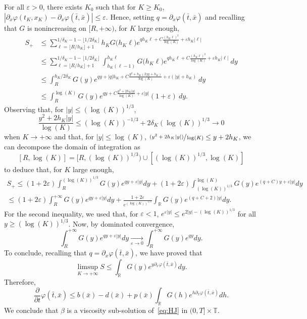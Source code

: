 \documentclass[JEP,XML,SOM,Unicode,published]{cedram}
\let\epsilon\varepsilon
\newcommand{\psfrac}[2]{\sfrac{(#1)}{#2}}
\theoremstyle{plain}
\theoremstyle{remark}
\newcommand\T{\mathbb{T}}
\newcommand\R{\mathbb{R}}
\begin{document}
For all $\varepsilon>0$, there exists $K_0$ such that for $K\geq K_0$, $|\partial_x\varphi(t_K,x_K)-\partial_x\varphi(\bar{t},\bar{x})| \leq \varepsilon$. Hence, setting $q=\partial_x\varphi(\bar{t},\bar{x})$ and recalling that $G$ is nonincreasing on $[R,+\infty)$, for $K$ large enough,\vspace*{-3pt}\enlargethispage{\baselineskip}
\begin{align*}
S_+ & \leq \sum_{\ell= \lfloor R/h_K \rfloor +1}^{1/\delta_K-1-\lfloor 1/2\delta_K\rfloor} h_K G\big(h_K\ell \big)e^{qh_K\ell+C\frac{(h_K\ell)^2}{\log(K)}+\varepsilon h_K|\ell|} \\
& \leq \sum_{\ell=\lfloor R/h_K \rfloor +1}^{1/\delta_K-1-\lfloor 1/2\delta_K\rfloor} \int_{h_K(\ell-1)}^{h_K\ell } G\big(h_K\ell \big)e^{q h_K\ell+C\frac{(h_K\ell)^2}{\log(K)}+\varepsilon h_K|\ell|} \ dy\\
& \leq \int_{R}^{h_K/2\delta_K} G(y) e^{q y+|q|h_K+C\frac{y^2+h_K(2|y|+h_K)}{\log(K)}+\varepsilon (|y|+h_K)}\ dy \\
& \leq \int_{R}^{\log(K)} G(y) e^{q y+C\frac{y^2+2h_K|y|}{\log(K)}+\varepsilon |y|}(1+\varepsilon)\ dy.
\end{align*}
Observing that, for $|y|\leq (\log(K))^{1/3}$,\vspace*{-3pt}
\[\frac{y^2+2h_K|y|}{\log(K)}\leq (\log(K))^{-1/3}+2\delta_K(\log(K))^{1/3}\to 0\]
when $K\to+\infty$ and that, for $|y|\leq \log(K)$, $\psfrac{y^2+2h_K|y|}{\log(K)}\leq y+2h_K$, we can decompose the domain of integration as
\[[R,\log(K)]=[R,(\log(K))^{1/3})\cup[(\log(K))^{1/3},\log(K)]\]to deduce that, for $K$ large enough,\vspace*{-3pt}
\begin{multline*}
S_+ \leq (1+2\varepsilon)\int_{R}^{(\log(K))^{1/3}}G(y)e^{q y+\varepsilon|y|}dy +(1+2\epsilon)\int_{(\log(K))^{1/3}}^{\log(K)}G(y) e^{(q+C)y+\varepsilon|y|}dy \\
\leq(1+2\varepsilon)\int_{R}^{+\infty}G(y)e^{q y+\varepsilon|y|}dy+\frac{1+2\epsilon}{e^{(\log(K))^{1/3}}}\int_\mathbb{R} G(y) e^{(q+C+2)|y|}dy.
\end{multline*}
For the second inequality, we used that, for $\varepsilon<1$, $e^{\varepsilon|y|}\leq e^{2|y|-(\log (K))^{1/3}}$ for all $y\geq (\log (K))^{1/3}$. Now, by dominated convergence,\vspace*{-3pt}
\[
\int_{R}^{+\infty}G(y)e^{q y+\varepsilon|y|}dy\xrightarrow[\varepsilon\to 0]{}\int_{R}^{+\infty}G(y)e^{q y}dy.
\]
To conclude, recalling that $q=\partial_x\varphi(\bar{t},\bar{x})$, we have proved that\vspace*{-3pt}
\[
\limsup_{K\to+\infty} S\leq \int_\mathbb{R}G(y)e^{ y\partial_x\varphi(\bar{t},\bar{x})}dy.
\]
Therefore,\vspace*{-3pt}
\[
\frac{\partial}{\partial t}\varphi(\bar{t},\bar{x})\leq b(\bar x)-d(\bar x)+p(\bar x)\int_{\R} G(h) e^{h\partial_x\varphi(\bar{t},\bar{x})}dh.
\]
We conclude that $\beta$ is a viscosity sub-solution of~\eqref{eq:HJ} in $(0,T]\times \T$.
\end{document}
